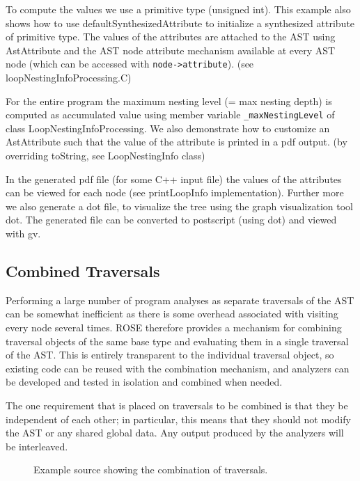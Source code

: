 To compute the values we use a primitive type (unsigned int). This
example also shows how to use defaultSynthesizedAttribute to
initialize a synthesized attribute of primitive type. The values of
the attributes are attached to the AST using AstAttribute and the AST
node attribute mechanism available at every AST node (which can be
accessed with \verb+node->attribute+).  (see
loopNestingInfoProcessing.C)

For the entire program the maximum nesting level (= max nesting depth)
is computed as accumulated value using member variable
\verb+_maxNestingLevel+ of class LoopNestingInfoProcessing. We also
demonstrate how to customize an AstAttribute such that the value of
the attribute is printed in a pdf output.  (by overriding toString,
see LoopNestingInfo class)

In the generated pdf file (for some C++ input file) the values of the
attributes can be viewed for each node (see printLoopInfo
implementation). Further more we also generate a dot file, to
visualize the tree using the graph visualization tool dot. The
generated file can be converted to postscript (using dot) and viewed
with gv.

\subsection{Combined Traversals}

Performing a large number of program analyses as separate traversals of the
AST can be somewhat inefficient as there is some overhead associated with
visiting every node several times. ROSE therefore provides a mechanism for
combining traversal objects of the same base type and evaluating them in a
single traversal of the AST. This is entirely transparent to the individual
traversal object, so existing code can be reused with the combination
mechanism, and analyzers can be developed and tested in isolation and combined
when needed.

The one requirement that is placed on traversals to be combined is that they
be independent of each other; in particular, this means that they should not
modify the AST or any shared global data. Any output produced by the analyzers
will be interleaved.

\begin{figure}[!h]
{\indent
{\mySmallFontSize

\begin{latexonly}
   
\end{latexonly}

\begin{htmlonly}
   
\end{htmlonly}

}
}
\caption{Example source showing the combination of traversals.}
\label{Tutorial:exampleCombinedTraversals}
\end{figure}


